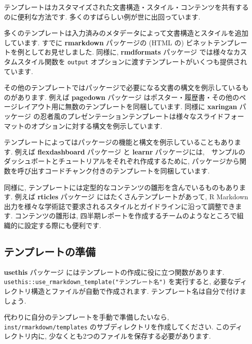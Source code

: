 \documentclass[
  11pt,
  lualatex,
  ja=standard]{bxjsreport}
\begin{document}
テンプレートはカスタマイズされた文書構造・スタイル・コンテンツを共有するのに便利な方法です. 多くのすばらしい例が世に出回っています.

多くのテンプレートは入力済みのメタデータによって文書構造とスタイルを追加しています. すでに \textbf{rmarkdown} パッケージの (HTML の) ビネットテンプレートを例としてお見せしました. 同様に, \textbf{rmdformats} パッケージ \autocite{R-rmdformats} では様々なカスタムスタイル関数を \texttt{output} オプションに渡すテンプレートがいくつも提供されています.

その他のテンプレートではパッケージで必要になる文書の構文を例示しているものがあります. 例えば \textbf{pagedown} パッケージ \autocite{R-pagedown} はポスター・履歴書・その他のページレイアウト用に無数のテンプレートを同梱しています. 同様に \textbf{xaringan} パッケージ \autocite{R-xaringan} の忍者風のプレゼンテーションテンプレートは様々なスライドフォーマットのオプションに対する構文を例示しています.

テンプレートによってはパッケージの機能と構文を例示していることもあります. 例えば \textbf{flexdashboard} パッケージ \autocite{R-flexdashboard} と \textbf{learnr} \autocite{R-learnr} パッケージには,　サンプルのダッシュボートとチュートリアルをそれぞれ作成するために, パッケージから関数を呼び出すコードチャンク付きのテンプレートを同梱しています.

同様に, テンプレートには定型的なコンテンツの雛形を含んでいるものもあります. 例えば \textbf{rticles} パッケージ \autocite{R-rticles} にはたくさんテンプレートがあって, R Markdown 出力を様々な学術誌で要求されるスタイルとガイドラインに沿って調整できます. コンテンツの雛形は, 四半期レポートを作成するチームのようなところで組織的に設定する際にも便利です.

\hypertarget{ux30c6ux30f3ux30d7ux30ecux30fcux30c8ux306eux6e96ux5099}{%
\subsection{テンプレートの準備}\label{ux30c6ux30f3ux30d7ux30ecux30fcux30c8ux306eux6e96ux5099}}

\textbf{usethis} パッケージ \autocite{R-usethis} にはテンプレートの作成に役に立つ関数があります. \texttt{usethis::use\_rmarkdown\_template("テンプレート名")} を実行すると, 必要なディレクトリ構造とファイルが自動で作成されます. テンプレート名は自分で付けましょう.

代わりに自分のテンプレートを手動で準備したいなら, \texttt{inst/rmarkdown/templates} のサブディレクトリを作成してください. このディレクトリ内に, 少なくとも2つのファイルを保存する必要があります.
\end{document}
